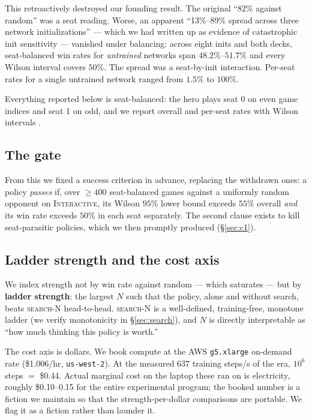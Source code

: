 \documentclass[11pt]{article}
\newcommand{\intdeck}{\textsc{Interactive}}
\newcommand{\searchn}[1]{\textsc{search}-#1}
\begin{document}
This retroactively destroyed our founding result. The original ``$82\%$ against random'' was a seat reading. Worse, an apparent ``13\%--89\% spread across three network initializations'' --- which we had written up as evidence of catastrophic init sensitivity --- vanished under balancing: across eight inits and both decks, seat-balanced win rates for \emph{untrained} networks span $48.2\%$--$51.7\%$ and every Wilson interval covers $50\%$. The spread was a seat-by-init interaction. Per-seat rates for a single untrained network ranged from $1.5\%$ to $100\%$.

Everything reported below is seat-balanced: the hero plays seat 0 on even game indices and seat 1 on odd, and we report overall and per-seat rates with Wilson intervals \citep{wilson1927}.

\subsection{The gate}

From this we fixed a success criterion in advance, replacing the withdrawn ones: a policy \emph{passes} if, over $\ge400$ seat-balanced games against a uniformly random opponent on \intdeck, its Wilson $95\%$ lower bound exceeds $55\%$ overall \emph{and} its win rate exceeds $50\%$ in each seat separately. The second clause exists to kill seat-parasitic policies, which we then promptly produced (\S\ref{sec:c1}).

\subsection{Ladder strength and the cost axis}
\label{sec:cost}

We index strength not by win rate against random --- which saturates --- but by \textbf{ladder strength}: the largest $N$ such that the policy, alone and without search, beats \searchn{N} head-to-head. \searchn{N} is a well-defined, training-free, monotone ladder (we verify monotonicity in \S\ref{sec:search}), and $N$ is directly interpretable as ``how much thinking this policy is worth.''

The cost axis is dollars. We book compute at the AWS \texttt{g5.xlarge} on-demand rate (\$1.006/hr, \texttt{us-west-2}). At the measured $637$ training steps/s of the era, $10^6$ steps $=$ \$0.44. Actual marginal cost on the laptop these ran on is electricity, roughly \$0.10--0.15 for the entire experimental program; the booked number is a fiction we maintain so that the strength-per-dollar comparisons are portable. We flag it as a fiction rather than launder it.
\end{document}
